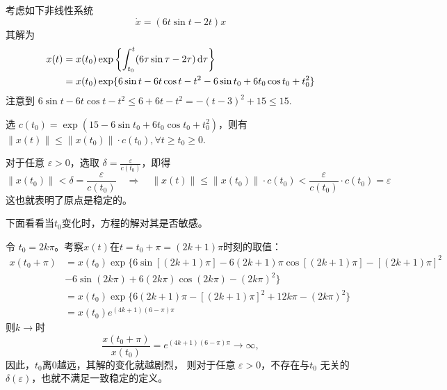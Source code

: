 \begin{example}[稳定但不一致稳定]
  考虑如下非线性系统
  \[ \dot{x} = (6 t  \sin  t - 2 t) x \]
  其解为
  \begin{align*}
    x (t) & =  x (t_0) \exp \left\{ \int^t_{t_0} (6 \tau \sin \tau - 2 \tau)
    \mathop{}\!\mathrm{d} \tau \right\}\\
    & =  x (t_0) \exp \{ 6 \sin  t - 6 t  \cos  t - t^2 - 6 \sin  t_0 + 6
    t_0 \cos  t_0 + t^2_0 \}
  \end{align*}
  注意到 $6 \sin  t - 6 t  \cos  t - t^2 \leq 6 + 6 t - t^2 = - (t - 3)^2 + 15
  \leq 15$.
  
  选 $c (t_0) = \exp (15 - 6 \sin  t_0 + 6 t_0 \cos  t_0 + t^2_0)$，则有 $\| x (t) \| \leq \| x (t_0) \| \cdot c (t_0), \forall t
  \geq t_0 \geq 0$.
  
  对于任意 $\varepsilon > 0$，选取 $\delta = \frac{\varepsilon}{c (t_0)}$，即得
  \[ \| x (t_0) \| < \delta = \frac{\varepsilon}{c (t_0)} \quad \Rightarrow
     \quad \| x (t) \| \leq \| x (t_0) \| \cdot c (t_0) < \frac{\varepsilon}{c
     (t_0)} \cdot c (t_0) = \varepsilon \]
  这也就表明了原点是稳定的。
  
  下面看看当$t_0$变化时，方程的解对其是否敏感。

  令 $t_0 = 2 k \pi$。考察$x (t)$在$t = t_0 + \pi = (2 k + 1)\pi$时刻的取值：
  \begin{align*}
    x (t_0 + \pi) & =  x (t_0) \exp \{ 6 \sin [(2 k + 1) \pi] - 6 (2 k + 1)
    \pi \cos [(2 k + 1) \pi] - [(2 k + 1) \pi]^2 \\
    &   - 6 \sin (2 k \pi) + 6 (2 k \pi) \cos (2 k \pi) - (2 k \pi)^2 \} \\
    & =  x (t_0) \exp \{ 6 (2 k + 1) \pi - [(2 k + 1) \pi]^2  + 12 k \pi -
    (2 k \pi)^2 \} \\
    & =  x (t_0) e^{\left( \text{} 4 k + 1 \right) (6 - \pi) \pi}
  \end{align*}
  则$k \rightarrow$时
  \[ \frac{x (t_0 + \pi)}{x (t_0)} = e^{\left( \text{} 4 k + 1 \right) (6 -
     \pi) \pi} \rightarrow \infty,  \]
  因此，$t_0$离$0$越远，其解的变化就越剧烈，
  则对于任意 $\varepsilon > 0$，不存在与$t_0$ 无关的$\delta (\varepsilon)$，也就不满足一致稳定的定义。
\end{example}